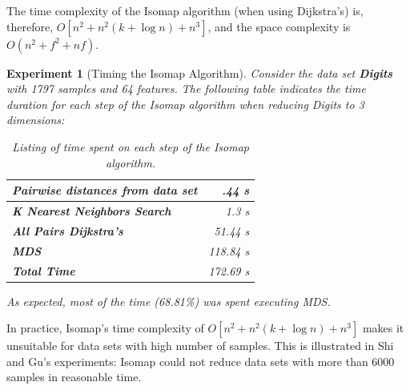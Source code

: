 \documentclass[12pt]{article}
\newtheorem{experiment}{Experiment}[section]
\begin{document}
The time complexity of the Isomap algorithm (when using Dijkstra's) is, therefore, $O[n^2 + n^2(k + \log n) + n^3]$, and the space complexity is $O(n^2 + f^2 + nf)$.

\begin{experiment}[Timing the Isomap Algorithm]
	Consider the data set \textbf{Digits} with 1797 samples and 64 features. The following table indicates the time duration for each step of the Isomap algorithm when reducing Digits to 3 dimensions:
	
	\begin{table}[H]
		\centering
		\begin{tabular}{|l|r|}
			\hline
			\textbf{Pairwise distances from data set} & .44 s \\\hline
			\textbf{K Nearest Neighbors Search} & 1.3 s \\\hline
			\textbf{All Pairs Dijkstra's} & 51.44 s\\\hline
			\textbf{MDS} & 118.84 s \\\hline
			\textbf{Total Time} & 172.69 s \\\hline
		\end{tabular}
		
		\caption{Listing of time spent on each step of the Isomap algorithm.}
	\end{table}
	
	As expected, most of the time (68.81\%) was spent executing MDS.
\end{experiment}

In practice, Isomap's time complexity of $O[n^2 + n^2(k + \log n) + n^3]$ makes it unsuitable for data sets with high number of samples. This is illustrated in Shi and Gu's experiments: Isomap could not reduce data sets with more than 6000 samples in reasonable time. \cite{shi2012fast}
\end{document}
